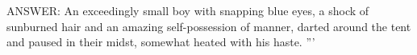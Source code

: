 
        
ANSWER:
    An exceedingly small boy with snapping blue eyes, a shock of sunburned
hair and an amazing self-possession of manner, darted around the tent
and paused in their midst, somewhat heated with his haste.    '''
